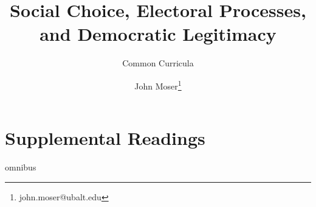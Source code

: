 \documentclass[twoside,titlepage,12pt,appendixprefix=true]{scrbook}
\begin{document}
    \author{John Moser\thanks{john.moser@ubalt.edu}}

    \title{Social Choice, Electoral Processes, and Democratic Legitimacy}
    \subtitle{Common Curricula}
    \maketitle[0]
    \frontmatter
    \tableofcontents
    
    \mainmatter
    
    \backmatter
    \part{Supplemental Readings}
    \appendix
    {omnibus}
    \printbibliography[title=Bibliography,heading=bibintoc]
\end{document}
